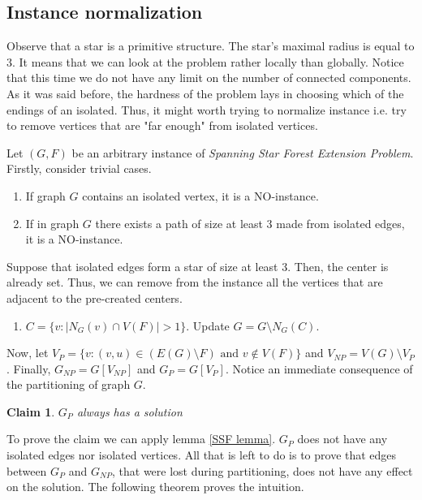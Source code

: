 \documentclass[en]{pracamgr}
\newtheorem{claim}{Claim}
\newcommand{\ssfe}{\emph{Spanning Star Forest Extension Problem}}
\begin{document}
\subsection{Instance normalization} 

Observe that a star is a primitive structure. The star's maximal radius is equal to 3. It means that we can look at the problem rather locally than globally. Notice that this time we do not have any limit on the number of connected components. As it was said before, the hardness of the problem lays in choosing which of the endings of an isolated. Thus, it might worth trying to normalize instance i.e. try to remove vertices that are "far enough" from isolated vertices.

Let $(G, F)$ be an arbitrary instance of \ssfe{}. Firstly, consider trivial cases.

\begin{enumerate}[leftmargin=*,label=\textbf{Reduction \arabic{enumi}}]
	\item If graph $G$ contains an isolated vertex, it is a NO-instance.
	\item If in graph $G$ there exists a path of size at least 3 made from isolated edges, it is a NO-instance.
\end{enumerate}

Suppose that isolated edges form a star of size at least 3. Then, the center is already set. Thus, we can remove from the instance all the vertices that are adjacent to the pre-created centers.
\begin{enumerate}[leftmargin=*,label=\textbf{Reduction \arabic{enumi}},resume]
	\item $C = \{v: |N_G(v) \cap V(F)| > 1\}$. Update $G= G \setminus N_G(C)$.
\end{enumerate}

Now, let $V_P = \{v: (v,u) \in (E(G) \setminus F) \text{ and } v \notin V(F)\}$ and $V_{NP} = V(G) \setminus V_P$. Finally, $G_{NP} = G[V_{NP}]$ and $G_P = G[V_P]$. Notice an immediate consequence of the partitioning of graph $G$.

\begin{claim}\label{gp cut}
	$G_P$ always has a solution
\end{claim}

To prove the claim we can apply lemma \ref{SSF lemma}. $G_P$ does not have any isolated edges nor isolated vertices. All that is left to do is to prove that edges between $G_P$ and $G_{NP}$, that were lost during partitioning, does not have any effect on the solution. The following theorem proves the intuition.
\end{document}
